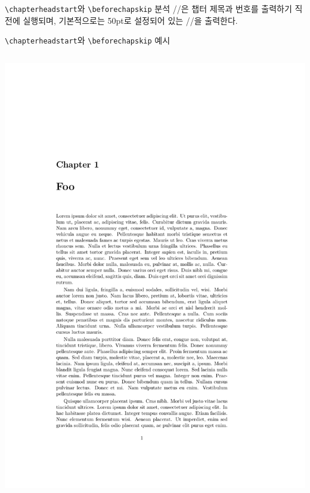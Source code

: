 \documentclass{beamer}
\def\tbs{\textbackslash}
\begin{document}
\begin{frame}[fragile]
  {\texttt{\tbs chapterheadstart}와 \texttt{\tbs beforechapskip} 분석}
  \ltxverb/\chapterheadstart/은 챕터 제목과 번호를 출력하기 직전에 실행되며,
  기본적으로는 50pt로 설정되어 있는 \ltxverb/\beforechapskip/을 출력한다.
\end{frame}

\begin{frame}[fragile]
  {\texttt{\tbs chapterheadstart}와 \texttt{\tbs beforechapskip} 예시}
  \begin{overprint}
    \begin{columns}
      \begin{column}{0.5\textwidth}
        \begin{latexcode}
          \setlength\beforechapskip{50pt}
        \end{latexcode}
        \begin{center}
          \includegraphics[frame,page=1,width=0.8\linewidth]{chapterheadstart}
        \end{center}
      \end{column}


\end{columns}
\end{overprint}
\end{frame}
\end{document}
